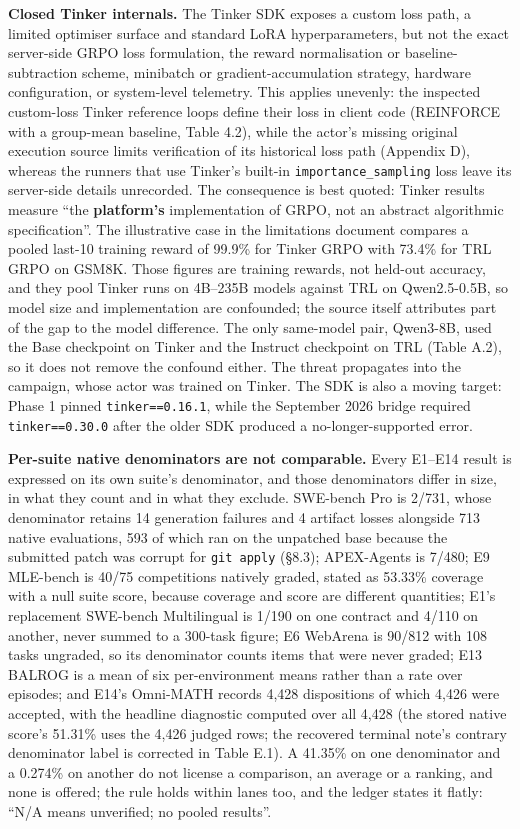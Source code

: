 \documentclass[12pt,a4paper]{report}
\begin{document}
\textbf{Closed Tinker internals.} The Tinker SDK exposes a custom loss
path, a limited optimiser surface and standard LoRA hyperparameters, but
not the exact server-side GRPO loss formulation, the reward
normalisation or baseline-subtraction scheme, minibatch or
gradient-accumulation strategy, hardware configuration, or system-level
telemetry. This applies unevenly: the inspected custom-loss Tinker
reference loops define their loss in client code (REINFORCE with a
group-mean baseline, Table 4.2), while the actor's missing original
execution source limits verification of its historical loss path
(Appendix D), whereas the runners that use Tinker's built-in
\texttt{importance\_sampling} loss leave its server-side details
unrecorded. The consequence is best quoted: Tinker results measure ``the
\textbf{platform's} implementation of GRPO, not an abstract algorithmic
specification''. The illustrative case in the limitations document
compares a pooled last-10 training reward of 99.9\% for Tinker GRPO with
73.4\% for TRL GRPO on GSM8K. Those figures are training rewards, not
held-out accuracy, and they pool Tinker runs on 4B--235B models against
TRL on Qwen2.5-0.5B, so model size and implementation are confounded;
the source itself attributes part of the gap to the model difference.
The only same-model pair, Qwen3-8B, used the Base checkpoint on Tinker
and the Instruct checkpoint on TRL (Table A.2), so it does not remove
the confound either. The threat propagates into the campaign, whose
actor was trained on Tinker. The SDK is also a moving target: Phase 1
pinned \texttt{tinker==0.16.1}, while the September 2026 bridge required
\texttt{tinker==0.30.0} after the older SDK produced a
no-longer-supported error.

\textbf{Per-suite native denominators are not comparable.} Every E1--E14
result is expressed on its own suite's denominator, and those
denominators differ in size, in what they count and in what they
exclude. SWE-bench Pro is 2/731, whose denominator retains 14 generation
failures and 4 artifact losses alongside 713 native evaluations, 593 of
which ran on the unpatched base because the submitted patch was corrupt
for \texttt{git\ apply} (§8.3); APEX-Agents is 7/480; E9 MLE-bench is
40/75 competitions natively graded, stated as 53.33\% coverage with a
null suite score, because coverage and score are different quantities;
E1's replacement SWE-bench Multilingual is 1/190 on one contract and
4/110 on another, never summed to a 300-task figure; E6 WebArena is
90/812 with 108 tasks ungraded, so its denominator counts items that
were never graded; E13 BALROG is a mean of six per-environment means
rather than a rate over episodes; and E14's Omni-MATH records 4,428
dispositions of which 4,426 were accepted, with the headline diagnostic
computed over all 4,428 (the stored native score's 51.31\% uses the
4,426 judged rows; the recovered terminal note's contrary denominator
label is corrected in Table E.1). A 41.35\% on one denominator and a
0.274\% on another do not license a comparison, an average or a ranking,
and none is offered; the rule holds within lanes too, and the ledger
states it flatly: ``N/A means unverified; no pooled results''.
\end{document}
